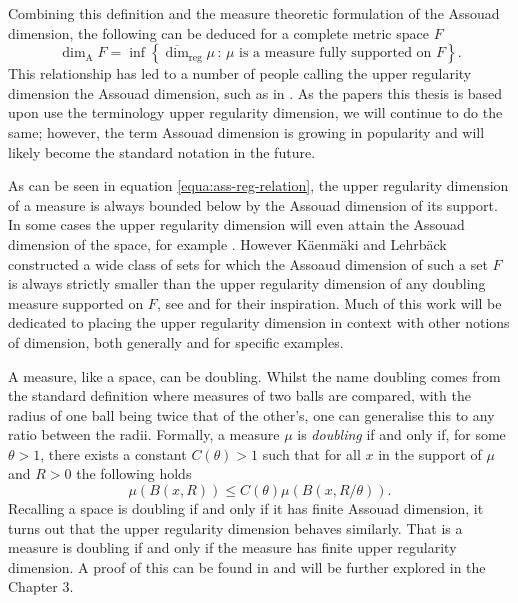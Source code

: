 Combining this definition and the measure theoretic formulation of the Assouad dimension, the following can be deduced for a complete metric space $F$
\begin{equation}\label{equa:ass-reg-relation}
    \dim_{\text{A}} F = \inf \left\{ \overline{\dim}_{\text{reg}} \mu \,  \colon \, \mu \text{ is a measure fully supported on } F\right\}.
\end{equation}
This relationship has led to a number of people calling the upper regularity dimension the Assouad dimension, such as in \cite{hare-hare-tros, hare-troscheit, fraser-kaenmaki-proj}. As the papers this thesis is based upon use the terminology upper regularity dimension, we will continue to do the same; however, the term Assouad dimension is growing in popularity and will likely become the standard notation in the future.

As can be seen in equation \eqref{equa:ass-reg-relation}, the upper regularity dimension of a measure is always bounded below by the Assouad dimension of its support. In some cases the upper regularity dimension will even attain the Assouad dimension of the space, for example \cite[Theorem 2.3]{fraser-howroyd1}. However K\"aenm\"aki and Lehrb\"ack constructed a wide class of sets for which the Assoaud dimension of such a set $F$ is always strictly smaller than the upper regularity dimension of any doubling measure supported on $F$, see  \cite{anti2} and \cite{konyagin} for their inspiration. Much of this work will be dedicated to placing the upper regularity dimension in context with other notions of dimension, both generally and for specific examples.

A measure, like a space, can be doubling. Whilst the name doubling comes from the standard definition where measures of two balls are compared, with the radius of one ball being twice that of the other's, one can generalise this to any ratio between the radii. Formally, a measure $\mu$ is \textit{doubling} if and only if, for some $\theta > 1$, there exists a constant $C(\theta) > 1$ such that for all $x$ in the support of $\mu$ and $R > 0$ the following holds
\[
\mu(B(x,R)) \le C(\theta) \mu(B(x,R/\theta)).
\]
Recalling a space is doubling if and only if it has finite Assouad dimension, it turns out that the upper regularity dimension behaves similarly. That is a measure is doubling if and only if the measure has finite upper regularity dimension. A proof of this can be found in \cite[Lemma 3.2]{kaenmakinew} and will be further explored in the Chapter 3. 


